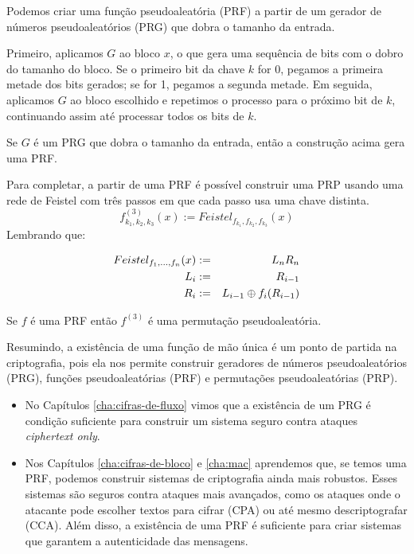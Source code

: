 Podemos criar uma função pseudoaleatória (PRF) a partir de um gerador de números pseudoaleatórios (PRG) que dobra o tamanho da entrada.

Primeiro, aplicamos $G$ ao bloco $x$, o que gera uma sequência de bits com o dobro do tamanho do bloco.
Se o primeiro bit da chave $k$ for 0, pegamos a primeira metade dos bits gerados; se for 1, pegamos a segunda metade.
Em seguida, aplicamos $G$ ao bloco escolhido e repetimos o processo para o próximo bit de $k$, continuando assim até processar todos os bits de $k$.

\begin{theorem}[Yao]
  Se $G$ é um PRG que dobra o tamanho da entrada, então a construção acima gera uma PRF.
\end{theorem}

Para completar, a partir de uma PRF é possível construir uma PRP usando uma rede de Feistel com três passos em que cada passo usa uma chave distinta.
\begin{displaymath}
  f_{k_1,k_2,k_3}^{(3)}(x) := Feistel_{f_{k_1},f_{k_2},f_{k_3}}(x)
\end{displaymath}
Lembrando que:

\begin{eqnarray*}
  Feistel_{f_1,\dots,f_n}(x) & := & L_nR_n\\
  L_i & := & R_{i-1}\\
  R_i & := & L_{i-1} \oplus f_i(R_{i-1})
\end{eqnarray*}


\begin{theorem}
  Se $f$ é uma PRF então $f^{(3)}$ é uma permutação pseudoaleatória.
\end{theorem}


Resumindo, a existência de uma função de mão única é um ponto de partida na criptografia, pois ela nos permite construir geradores de números pseudoaleatórios (PRG), funções pseudoaleatórias (PRF) e permutações pseudoaleatórias (PRP).
\begin{itemize}
\item No Capítulos \ref{cha:cifras-de-fluxo} vimos que a existência de um PRG é condição suficiente para construir um sistema seguro contra ataques {\em ciphertext only}.
\item Nos Capítulos \ref{cha:cifras-de-bloco} e \ref{cha:mac} aprendemos que, se temos uma PRF, podemos construir sistemas de criptografia ainda mais robustos. Esses sistemas são seguros contra ataques mais avançados, como os ataques onde o atacante pode escolher textos para cifrar (CPA) ou até mesmo descriptografar (CCA).
  Além disso, a existência de uma PRF é suficiente para criar sistemas que garantem a autenticidade das mensagens.
\end{itemize}

